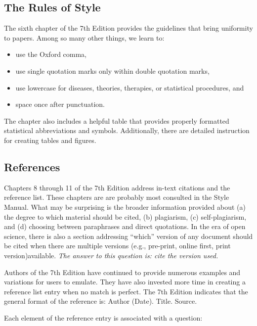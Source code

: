 \documentclass[
  11pt,
]{book}
\providecommand{\tightlist}{%
  \setlength{\itemsep}{0pt}\setlength{\parskip}{0pt}}
\begin{document}
\hypertarget{the-rules-of-style}{%
\subsection{The Rules of Style}\label{the-rules-of-style}}

The sixth chapter of the 7th Edition provides the guidelines that bring uniformity to papers. Among so many other things, we learn to:

\begin{itemize}
\tightlist
\item
  use the Oxford comma,
\item
  use single quotation marks only within double quotation marks,
\item
  use lowercase for diseases, theories, therapies, or statistical procedures, and
\item
  space once after punctuation.
\end{itemize}

The chapter also includes a helpful table that provides properly formatted statistical abbreviations and symbols. Additionally, there are detailed instruction for creating tables and figures.

\hypertarget{references-2}{%
\subsection{References}\label{references-2}}

Chapters 8 through 11 of the 7th Edition address in-text citations and the reference list. These chapters are are probably most consulted in the Style Manual. What may be surprising is the broader information provided about (a) the degree to which material should be cited, (b) plagiarism, (c) self-plagiarism, and (d) choosing between paraphrases and direct quotations. In the era of open science, there is also a section addressing ``which'' version of any document should be cited when there are multiple versions (e.g., pre-print, online first, print version)available. \emph{The answer to this question is: cite the version used.}

Authors of the 7th Edition have continued to provide numerous examples and variations for users to emulate. They have also invested more time in creating a reference list entry when no match is perfect. The 7th Edition indicates that the general format of the reference is: Author (Date). Title. Source.

Each element of the reference entry is associated with a question:
\end{document}
